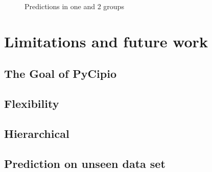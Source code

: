 \documentclass{article}
\begin{document}
\begin{figure}[H]
    \centering
    \quad
    \caption{Predictions in one and 2 groups}
\end{figure}

\section{Limitations and future work}

\subsection{The Goal of PyCipio}

\subsection{Flexibility}

\subsection{Hierarchical}

\subsection{Prediction on unseen data set}




\end{document}
